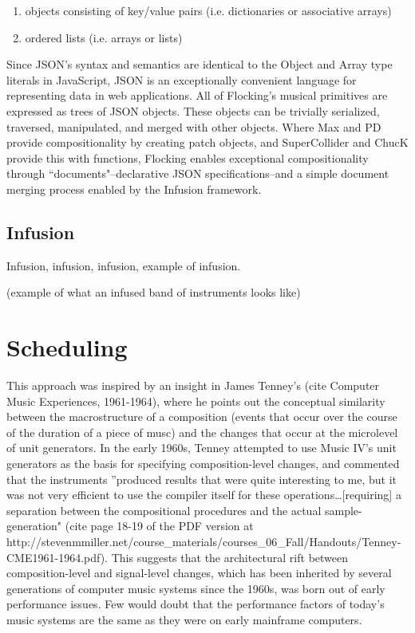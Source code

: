 \documentclass{article}
\begin{document}
\begin{enumerate}
\item objects consisting of key/value pairs (i.e. dictionaries or associative arrays)
\item ordered lists (i.e. arrays or lists)
\end{enumerate}

Since JSON's syntax and semantics are identical to the Object and Array type literals in JavaScript, JSON is an exceptionally convenient language for representing data in web applications. All of Flocking's musical primitives are expressed as trees of JSON objects. These objects can be trivially serialized, traversed, manipulated, and merged with other objects. Where Max and PD provide compositionality by creating patch objects, and SuperCollider and ChucK provide this with functions, Flocking enables exceptional compositionality through ``documents"--declarative JSON specifications--and a simple document merging process enabled by the Infusion framework.

\subsection{Infusion}
Infusion, infusion, infusion, example of infusion.

(example of what an infused band of instruments looks like)

\section{Scheduling}

This approach was inspired by an insight in James Tenney's (cite Computer Music Experiences, 1961-1964), where he points out the conceptual similarity between the macrostructure of a composition (events that occur over the course of the duration of a piece of musc) and the changes that occur at the microlevel of unit generators. In the early 1960s, Tenney attempted to use Music IV's unit generators as the basis for specifying composition-level changes, and commented that the instruments ''produced results that were quite interesting to me, but it was not very efficient to use the compiler itself for these operations\ldots [requiring] a separation between the compositional procedures and the actual sample-generation" (cite page 18-19 of the PDF version at http://stevenmmiller.net/course_materials/courses_06_Fall/Handouts/Tenney-CME1961-1964.pdf). This suggests that the architectural rift between composition-level and signal-level changes, which has been inherited by several generations of computer music systems since the 1960s, was born out of early performance issues. Few would doubt that the performance factors of today's music systems are the same as they were on early mainframe computers.
\end{document}
